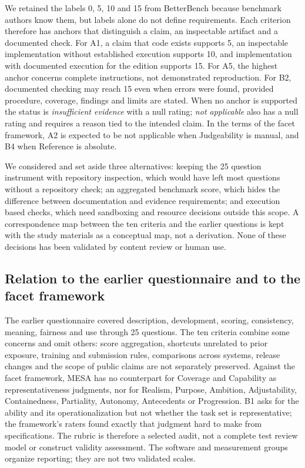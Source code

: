 \documentclass[10pt,conference]{IEEEtran}
\begin{document}
We retained the labels 0, 5, 10 and 15 from BetterBench because benchmark authors know them, but labels alone do not define requirements. Each criterion therefore has anchors that distinguish a claim, an inspectable artifact and a documented check. For A1, a claim that code exists supports 5, an inspectable implementation without established execution supports 10, and implementation with documented execution for the edition supports 15. For A5, the highest anchor concerns complete instructions, not demonstrated reproduction. For B2, documented checking may reach 15 even when errors were found, provided procedure, coverage, findings and limits are stated. When no anchor is supported the status is \emph{insufficient evidence} with a null rating; \emph{not applicable} also has a null rating and requires a reason tied to the intended claim. In the terms of the facet framework, A2 is expected to be not applicable when Judgeability is manual, and B4 when Reference is absolute.

We considered and set aside three alternatives: keeping the 25 question instrument with repository inspection, which would have left most questions without a repository check; an aggregated benchmark score, which hides the difference between documentation and evidence requirements; and execution based checks, which need sandboxing and resource decisions outside this scope. A correspondence map between the ten criteria and the earlier questions is kept with the study materials as a conceptual map, not a derivation. None of these decisions has been validated by content review or human use.

\subsection{Relation to the earlier questionnaire and to the facet framework}
The earlier questionnaire covered description, development, scoring, consistency, meaning, fairness and use through 25 questions. The ten criteria combine some concerns and omit others: score aggregation, shortcuts unrelated to prior exposure, training and submission rules, comparisons across systems, release changes and the scope of public claims are not separately preserved. Against the facet framework, MESA has no counterpart for Coverage and Capability as representativeness judgments, nor for Realism, Purpose, Ambition, Adjustability, Containedness, Partiality, Autonomy, Antecedents or Progression. B1 asks for the ability and its operationalization but not whether the task set is representative; the framework's raters found exactly that judgment hard to make from specifications. The rubric is therefore a selected audit, not a complete test review model or construct validity assessment. The software and measurement groups organize reporting; they are not two validated scales.
\end{document}
